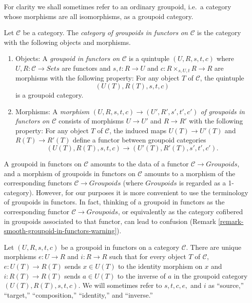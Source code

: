 \noindent
For clarity we shall sometimes refer to an ordinary groupoid, i.e.\ a category 
whose morphisms are all isomorphisms, as a groupoid category.

\begin{definition}
\label{definition-groupoid-in-functors}
Let $\mathcal{C}$ be a category. The {\it category of groupoids in functors on 
$\mathcal{C}$} is the category with the following objects and morphisms.
\begin{enumerate}
\item Objects: A {\it groupoid in functors on $\mathcal{C}$} is a quintuple 
$(U,R,s,t,c)$ where $U,R: \mathcal{C} \to \textit{Sets}$ are 
functors and $s,t: R \to U$ and $c: R \times_{s,U,t} R \to R$ 
are morphisms with the following property: For any object $T$ of $\mathcal{C}$, 
the quintuple
\[ (U(T), R(T), s,t,c) \]
is a groupoid category.
\item Morphisms: A {\it morphism $(U,R,s,t,c) \to (U',R',s',t',c')$ of 
groupoids in functors on $\mathcal{C}$} consists of morphisms $U \to U'$ 
and $R \to R'$ with the following property: For any object $T$ of 
$\mathcal{C}$, the induced maps $U(T) \to U'(T)$ and $R(T) \to 
R'(T)$ define a functor between groupoid categories
\[ (U(T), R(T), s,t,c) \to (U'(T), R'(T), s',t',c') .\] 
\end{enumerate}
\end{definition}

\begin{remark}
\label{remark-confusion-groupoids-in-functors}
A groupoid in functors on $\mathcal{C}$ amounts to the data of a functor $ 
\mathcal{C} \to \textit{Groupoids}$, and a morphism of groupoids 
in functors on $\mathcal{C}$ amounts to a morphism of the corresponding functors 
$\mathcal{C} \to \textit{Groupoids}$ (where 
$\textit{Groupoids}$ is regarded as a 1-category).  However, for our 
purposes it is more convenient to use the terminology of groupoids in functors. 
 In fact, thinking of a groupoid in functors as the corresponding functor 
$\mathcal{C} \to \textit{Groupoids}$, or equivalently as the 
category cofibered in groupoids associated to that functor, can lead to 
confusion (Remark \ref{remark-smooth-groupoid-in-functors-warning}).
\end{remark}

\begin{remark}
\label{remark-identity-inverse}
Let $(U,R,s,t,c)$ be a groupoid in functors on a category $\mathcal{C}$. There 
are unique morphisms $e: U \to R$ and $i: R \to R$ such that 
for every object $T$ of $\mathcal{C}$, $e: U(T) \to R(T)$ sends $x \in 
U(T)$ to the identity morphism on $x$ and $i: R(T) \to R(T)$ sends $a 
\in U(T)$ to the inverse of $a$ in the groupoid category $(U(T),R(T),s,t,c)$. 
We will sometimes refer to $s,t,c,e,$ and $i$ as ``source,'' ``target,'' 
``composition,'' ``identity,'' and ``inverse.''
\end{remark}


